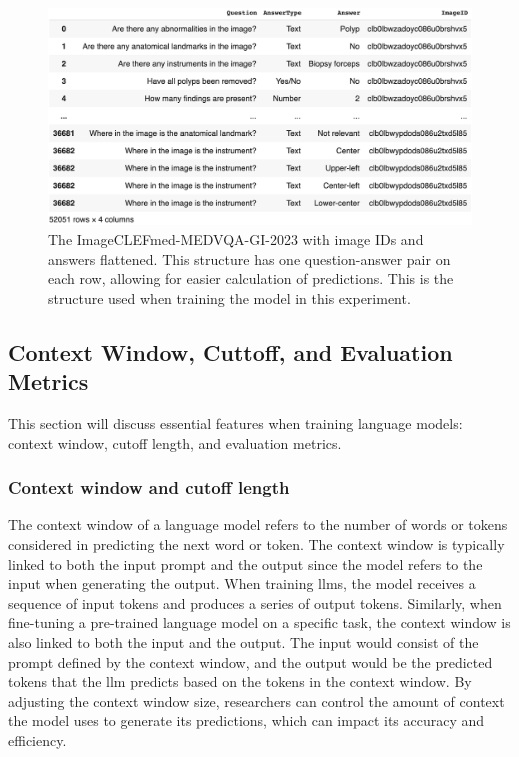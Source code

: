         \begin{figure}[htb]
            \centering
            \centerline{
            \includegraphics[width=1.2\textwidth]{images/colon_vqa_pandas_exploded.png}}
            \caption{The ImageCLEFmed-MEDVQA-GI-2023 with image IDs and answers flattened. This structure has one question-answer pair on each row, allowing for easier calculation of predictions. This is the structure used when training the model in this experiment.}
            \label{fig:colon_vqa_pandas_exploded}
        \end{figure}

        
        
    \subsection{Context Window, Cuttoff, and Evaluation Metrics}
    \label{sec:3_contex_cutoff_eval}
         This section will discuss essential features when training language models: context window, cutoff length, and evaluation metrics. 

        \subsubsection{Context window and cutoff length}
       
        The context window of a language model refers to the number of words or tokens considered in predicting the next word or token. The context window is typically linked to both the input prompt and the output since the model refers to the input when generating the output. When training \glspl{llm}, the model receives a sequence of input tokens and produces a series of output tokens. 
        Similarly, when fine-tuning a pre-trained language model on a specific task, the context window is also linked to both the input and the output. 
        The input would consist of the prompt defined by the context window, and the output would be the predicted tokens that the \gls{llm} predicts based on the tokens in the context window. 
        By adjusting the context window size, researchers can control the amount of context the model uses to generate its predictions, which can impact its accuracy and efficiency.

